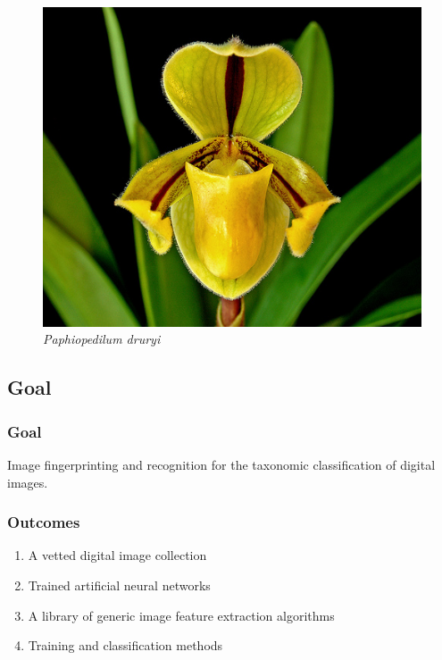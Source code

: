 \documentclass[]{beamer}
\begin{document}
\begin{frame}
\begin{figure}[!htb]
              \includegraphics[width=\linewidth]{Paphiopedilum_druryi}
              \caption*{\textit{Paphiopedilum druryi}}
            \endminipage\hfill
        \end{figure}
    \end{frame}

    \subsection{Goal}

    \begin{frame}
        \frametitle{Goal}

        Image fingerprinting and recognition for the taxonomic classification
        of digital images.
    \end{frame}

    \begin{frame}
        \frametitle{Outcomes}

        \begin{enumerate}
            \item A vetted digital image collection
            \item Trained artificial neural networks
            \item A library of generic image feature extraction algorithms
            \item Training and classification methods
        \end{enumerate}
    \end{frame}
\end{document}

